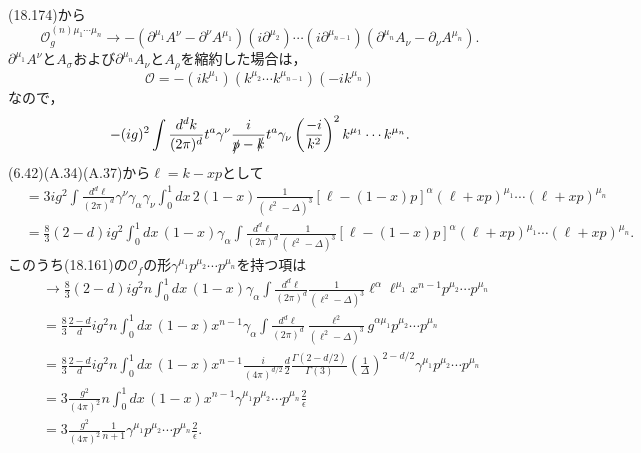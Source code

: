 (18.174)から
\[
\mathcal{O}_g^{(n)\mu_1\cdots\mu_n} \to - (\partial^{\mu_1}A^\nu - \partial^\nu A^{\mu_1})
(i\partial^{\mu_2}) \cdots (i\partial^{\mu_{n-1}}) (\partial^{\mu_n}A_\nu - \partial_\nu A^{\mu_n}) .
\]
$\partial^{\mu_1}A^\nu$と$A_\sigma$および$\partial^{\mu_n}A_\nu$と$A_\rho$を縮約した場合は，
\[ \mathcal{O} = -(ik^{\mu_1}) (k^{\mu_2}\cdots k^{\mu_{n-1}}) (-ik^{\mu_n}) \]
なので，
\[
- (ig)^2 \int \frac{d^dk}{(2\pi)^d} t^a \gamma^\nu \frac{i}{\slashed{p} - \slashed{k}} t^a \gamma_\nu
\left( \frac{-i}{k^2} \right)^2 k^{\mu_1} \cdots k^{\mu_n} .
\]
(6.42)(A.34)(A.37)から$\ell=k-xp$として
\begin{align*}
  &= 3 ig^2 \int\frac{d^d\ell}{(2\pi)^d} \gamma^\nu \gamma_\alpha \gamma_\nu \int_0^1 dx \, 2(1-x)
  \frac{1}{(\ell^2 - \Delta)^3} [\ell - (1-x)p]^\alpha (\ell+xp)^{\mu_1} \cdots (\ell+xp)^{\mu_n} \\
  &= \frac{8}{3} (2-d) ig^2 \int_0^1 dx \, (1-x) \gamma_\alpha \int\frac{d^d\ell}{(2\pi)^d}
  \frac{1}{(\ell^2 - \Delta)^3} [\ell - (1-x)p]^\alpha (\ell+xp)^{\mu_1} \cdots (\ell+xp)^{\mu_n} .
\end{align*}
このうち(18.161)の$\mathcal{O}_f$の形$\gamma^{\mu_1} p^{\mu_2} \cdots p^{\mu_n}$を持つ項は
\begin{align*}
  &\to \frac{8}{3} (2-d) ig^2 n \int_0^1 dx \, (1-x) \gamma_\alpha \int\frac{d^d\ell}{(2\pi)^d}
  \frac{1}{(\ell^2 - \Delta)^3} \ell^\alpha \ell^{\mu_1} x^{n-1} p^{\mu_2} \cdots p^{\mu_n} \\
  &= \frac{8}{3} \frac{2-d}{d} ig^2 n \int_0^1 dx \, (1-x) x^{n-1} \gamma_\alpha \int\frac{d^d\ell}{(2\pi)^d}
  \frac{\ell^2}{(\ell^2 - \Delta)^3} g^{\alpha\mu_1} p^{\mu_2} \cdots p^{\mu_n} \\
  &= \frac{8}{3} \frac{2-d}{d} ig^2 n \int_0^1 dx \, (1-x) x^{n-1}
  \frac{i}{(4\pi)^{d/2}} \frac{d}{2} \frac{\Gamma(2-d/2)}{\Gamma(3)} \left( \frac{1}{\Delta} \right)^{2-d/2}
  \gamma^{\mu_1} p^{\mu_2} \cdots p^{\mu_n} \\
  &= 3 \frac{g^2}{(4\pi)^2} n \int_0^1 dx \, (1-x) x^{n-1} \gamma^{\mu_1} p^{\mu_2} \cdots p^{\mu_n} \frac{2}{\epsilon} \\
  &= 3 \frac{g^2}{(4\pi)^2} \frac{1}{n+1} \gamma^{\mu_1} p^{\mu_2} \cdots p^{\mu_n} \frac{2}{\epsilon} .
\end{align*}

